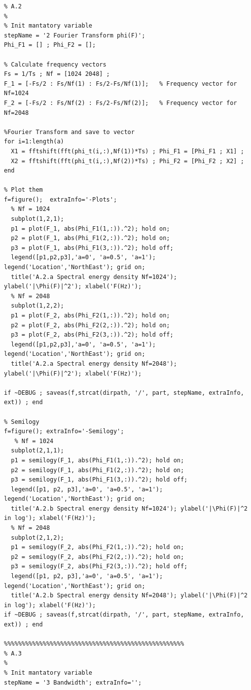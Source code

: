 \documentclass[11pt]{article}
\begin{document}
\begin{lstlisting}[caption = {\texttt{part\_a.m}}]
%%%%%%%%%%%%%%%%%%%%%%%%%%%%%%%%%%%%%%%%%%%%%%%%%%%
% A.2
%
% Init mantatory variable 
stepName = '2 Fourier Transform phi(F)';
Phi_F1 = [] ; Phi_F2 = [];

% Calculate frequency vectors
Fs = 1/Ts ; Nf = [1024 2048] ;              
F_1 = [-Fs/2 : Fs/Nf(1) : Fs/2-Fs/Nf(1)];   % Frequency vector for Nf=1024
F_2 = [-Fs/2 : Fs/Nf(2) : Fs/2-Fs/Nf(2)];   % Frequency vector for Nf=2048

%Fourier Transform and save to vector
for i=1:length(a)
  X1 = fftshift(fft(phi_t(i,:),Nf(1))*Ts) ; Phi_F1 = [Phi_F1 ; X1] ;
  X2 = fftshift(fft(phi_t(i,:),Nf(2))*Ts) ; Phi_F2 = [Phi_F2 ; X2] ; 
end

% Plot them 
f=figure();  extraInfo='-Plots';
  % Nf = 1024
  subplot(1,2,1); 
  p1 = plot(F_1, abs(Phi_F1(1,:)).^2); hold on;
  p2 = plot(F_1, abs(Phi_F1(2,:)).^2); hold on;
  p3 = plot(F_1, abs(Phi_F1(3,:)).^2); hold off;
  legend([p1,p2,p3],'a=0', 'a=0.5', 'a=1'); legend('Location','NorthEast'); grid on;
  title('A.2.a Spectral energy density Nf=1024'); ylabel('|\Phi(F)|^2'); xlabel('F(Hz)');
  % Nf = 2048
  subplot(1,2,2); 
  p1 = plot(F_2, abs(Phi_F2(1,:)).^2); hold on;
  p2 = plot(F_2, abs(Phi_F2(2,:)).^2); hold on;
  p3 = plot(F_2, abs(Phi_F2(3,:)).^2); hold off;
  legend([p1,p2,p3],'a=0', 'a=0.5', 'a=1'); legend('Location','NorthEast'); grid on;
  title('A.2.a Spectral energy density Nf=2048'); ylabel('|\Phi(F)|^2'); xlabel('F(Hz)');
  
if ~DEBUG ; saveas(f,strcat(dirpath, '/', part, stepName, extraInfo, ext)) ; end

% Semilogy 
f=figure(); extraInfo='-Semilogy';
   % Nf = 1024
  subplot(2,1,1); 
  p1 = semilogy(F_1, abs(Phi_F1(1,:)).^2); hold on;
  p2 = semilogy(F_1, abs(Phi_F1(2,:)).^2); hold on;
  p3 = semilogy(F_1, abs(Phi_F1(3,:)).^2); hold off;
  legend([p1, p2, p3],'a=0', 'a=0.5', 'a=1'); legend('Location','NorthEast'); grid on;
  title('A.2.b Spectral energy density Nf=1024'); ylabel('|\Phi(F)|^2 in log'); xlabel('F(Hz)');
  % Nf = 2048
  subplot(2,1,2); 
  p1 = semilogy(F_2, abs(Phi_F2(1,:)).^2); hold on;
  p2 = semilogy(F_2, abs(Phi_F2(2,:)).^2); hold on;
  p3 = semilogy(F_2, abs(Phi_F2(3,:)).^2); hold off;
  legend([p1, p2, p3],'a=0', 'a=0.5', 'a=1'); legend('Location','NorthEast'); grid on;
  title('A.2.b Spectral energy density Nf=2048'); ylabel('|\Phi(F)|^2 in log'); xlabel('F(Hz)');
if ~DEBUG ; saveas(f,strcat(dirpath, '/', part, stepName, extraInfo, ext)) ; end

%%%%%%%%%%%%%%%%%%%%%%%%%%%%%%%%%%%%%%%%%%%%%%%%%%%
% A.3
%
% Init mantatory variable 
stepName = '3 Bandwidth'; extraInfo='';


\end{lstlisting}
\end{document}

